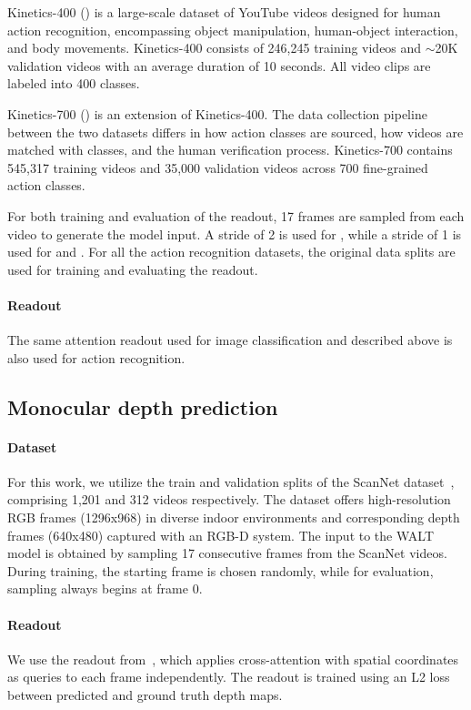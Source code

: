 Kinetics-400 (\Tkfour) is a large-scale dataset of YouTube videos designed for human action recognition, encompassing object manipulation, human-object interaction, and body movements. Kinetics-400 consists of 246,245 training videos and $\sim$20K validation videos with an average duration of 10 seconds. All video clips are labeled into 400 classes.

Kinetics-700 (\Tkseven) is an extension of Kinetics-400. The data collection pipeline between the two datasets differs in how action classes are sourced, how videos are matched with classes, and the human verification process. Kinetics-700 contains 545,317 training videos and 35,000 validation videos across 700 fine-grained action classes.

For both training and evaluation of the readout, 17 frames are sampled from each video to generate the model input. A stride of 2 is used for \Tssv, while a stride of 1 is used for \Tkfour and \Tkseven. For  all  the  action recognition datasets, the original data splits are used for training and evaluating the readout.







\paragraph{Readout}
The same attention readout used for image classification and described above is also used for action recognition. 


\subsection{Monocular depth prediction}
\paragraph{Dataset}
For this work, we utilize the train and validation splits of the ScanNet dataset~\cite{scannet}, comprising 1,201 and 312 videos respectively. The dataset offers high-resolution RGB frames (1296x968) in diverse indoor environments and corresponding depth frames (640x480) captured with an RGB-D system. The input to the WALT model is obtained by sampling 17 consecutive frames from the ScanNet videos. During training, the starting frame is chosen randomly, while for evaluation, sampling always begins at frame 0. %

\paragraph{Readout}
We use the readout from~\cite{SRT}, which applies cross-attention with spatial coordinates as queries to each frame independently. The readout is trained using an L2 loss between predicted and ground truth depth maps.

